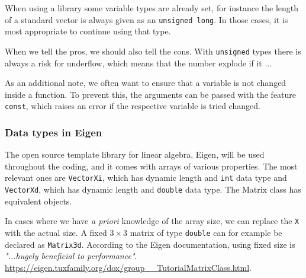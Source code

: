 When using a library some variable types are already set, for instance the length of a standard vector is always given as an \texttt{unsigned long}. In those cases, it is most appropriate to continue using that type. 

When we tell the pros, we should also tell the cons. With \texttt{unsigned} types there is always a risk for underflow, which means that the number explode if it ...

As an additional note, we often want to ensure that a variable is not changed inside a function. To prevent this, the arguments can be passed with the feature \texttt{const}, which raises an error if the respective variable is tried changed. 

\subsubsection{Data types in Eigen}
The open source template library for linear algebra, Eigen, will be used throughout the coding, and it comes with arrays of various properties. The most relevant ones are \texttt{VectorXi}, which has dynamic length and \texttt{int} data type and \texttt{VectorXd}, which has dynamic length and \texttt{double} data type. The Matrix class has equivalent objects. 

In cases where we have \textit{a priori} knowledge of the array size, we can replace the \texttt{X} with the actual size. A fixed $3\times 3$ matrix of type \texttt{double} can for example be declared as \texttt{Matrix3d}. According to the Eigen documentation, using fixed size is \textit{"...hugely beneficial to performance"}. \url{https://eigen.tuxfamily.org/dox/group__TutorialMatrixClass.html}.